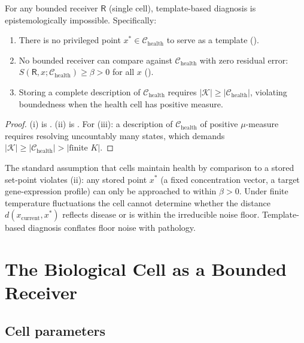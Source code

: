 \documentclass[twocolumn,11pt,a4paper]{article}
\newcommand{\receiver}{\mathsf{R}}
\newcommand{\Cell}{\mathcal{C}}
\newcommand{\K}{\mathcal{K}}
\begin{document}
\begin{theorem}\label{thm:no-template}
For any bounded receiver $\receiver$ (single cell), template-based
diagnosis is epistemologically impossible. Specifically:
\begin{enumerate}[label=(\roman*),leftmargin=*,nosep]
\item There is no privileged point $x^* \in \Cell_{\mathrm{health}}$
      to serve as a template ().
\item No bounded receiver can compare against $\Cell_{\mathrm{health}}$
      with zero residual error: $S(\receiver, x; \Cell_{\mathrm{health}})
      \geq \beta > 0$ for all $x$ ().
\item Storing a complete description of $\Cell_{\mathrm{health}}$ requires
      $|\K| \geq |\Cell_{\mathrm{health}}|$, violating boundedness when
      the health cell has positive measure.
\end{enumerate}
\end{theorem}

\begin{proof}
(i) is . (ii) is . For (iii): a description of
$\Cell_{\mathrm{health}}$ of positive $\mu$-measure requires resolving
uncountably many states, which demands $|\K| \geq |\Cell_{\mathrm{health}}|
> |\text{finite }K|$.
\end{proof}

\begin{remark}\label{rem:traditional-wrong}
The standard assumption that cells maintain health by comparison to a stored
set-point violates (ii): any stored point $x^*$ (a fixed concentration
vector, a target gene-expression profile) can only be approached to within
$\beta > 0$. Under finite temperature fluctuations the cell cannot determine
whether the distance $d(x_{\mathrm{current}}, x^*)$ reflects disease or
is within the irreducible noise floor. Template-based diagnosis conflates
floor noise with pathology.
\end{remark}

\section{The Biological Cell as a Bounded Receiver}
\label{sec:cell-receiver}

\subsection{Cell parameters}
\end{document}
